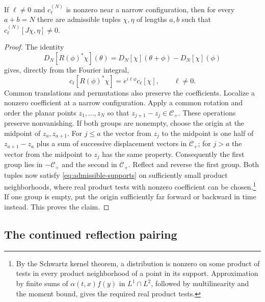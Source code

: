 \documentclass[11pt, letterpaper, reqno]{amsart}
\theoremstyle{definition}
\newenvironment{lemma}
{\pushQED{\qed}\renewcommand{\qedsymbol}{$\blacksquare$}\lemmax}
{\popQED\endlemmax}
\theoremstyle{remark}
\newcommand{\calC}{\mathcal{C}}
\begin{document}
\begin{lemma}\label{lem:testing}
If $\ell\neq0$ and $c_\ell^{(N)}$ is nonzero near a narrow
configuration, then for every $a+b=N$ there are admissible tuples
$\chi,\eta$ of lengths $a,b$ such that
$c_\ell^{(N)}[J\chi,\eta]\neq0$.
\end{lemma}
\begin{proof}
The identity
\begin{equation}
 D_N[R(\phi)^*\chi](\theta)
   =D_N[\chi](\theta+\phi)-D_N[\chi](\phi)
\end{equation}
gives, directly from the Fourier integral,
\begin{equation}\label{eq:coefficient-rotation}
 c_\ell[R(\phi)^*\chi]=e^{i\ell\phi}c_\ell[\chi],
 \qquad\ell\neq0.
\end{equation}
Common translations and permutations also preserve the coefficients.
Localize a nonzero coefficient at a narrow configuration. Apply a common
rotation and order the planar points $z_1,\ldots,z_N$ so that
$z_{j+1}-z_j\in\calC_+$.
These operations preserve nonvanishing. If both groups are nonempty,
choose the origin at the
midpoint of $z_a,z_{a+1}$. For $j\leq a$ the vector from $z_j$ to
the midpoint is one half of $z_{a+1}-z_a$ plus a sum of successive
displacement vectors in $\calC_+$; for $j>a$ the vector from the
midpoint to $z_j$ has the same property.
Consequently the first group lies in $-\calC_+$ and the second in
$\calC_+$. Reflect and reverse the first group. Both tuples now
satisfy \eqref{eq:admissible-supports} on sufficiently small product
neighborhoods, where real product tests with nonzero coefficient
can be chosen.\footnote{By the Schwartz kernel theorem, a distribution
is nonzero on some product of tests in every product neighborhood
of a point in its support. Approximation by finite sums of
$\alpha(t,x)f(y)$ in $L^1\cap L^2$, followed by multilinearity and the
moment bound, gives the required real product tests.}
If one group is empty, put the origin sufficiently far forward or
backward in time instead. This proves the claim.
\end{proof}

\subsection{The continued reflection pairing}\label{subsec:continued-pairing}
\end{document}
